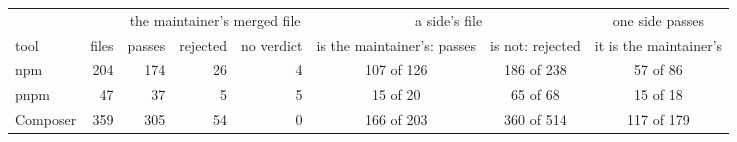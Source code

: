 \begin{tabular}{lrrrrccc}
\toprule
& & \multicolumn{3}{c}{the maintainer's merged file} & \multicolumn{2}{c}{a side's file} & one side passes \\
\cmidrule(lr){3-5}\cmidrule(lr){6-7}
tool & files & passes & rejected & no verdict & is the maintainer's: passes & is not: rejected & it is the maintainer's \\
\midrule
npm & 204 & 174 & 26 & 4 & 107 of 126 & 186 of 238 & 57 of 86 \\
pnpm & 47 & 37 & 5 & 5 & 15 of 20 & 65 of 68 & 15 of 18 \\
Composer & 359 & 305 & 54 & 0 & 166 of 203 & 360 of 514 & 117 of 179 \\
\bottomrule
\end{tabular}
